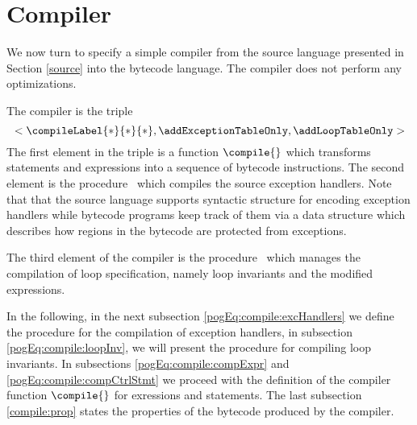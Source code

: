 

\newtheorem{Compiler}{Definition}

\section{Compiler} \label{compile}

We now turn to specify a simple compiler from the source language presented in Section
\ref{source} into the bytecode language. The compiler does not perform any optimizations. 

The compiler is the triple
 $$< \compileLabel{*}{*}{*}, \addExceptionTableOnly , \addLoopTableOnly >$$
 The first element in the triple is a  function $\compile{}$ which transforms statements and expressions
 into a sequence of bytecode instructions. 
The second element is the procedure  \addExceptionTableOnly \ which compiles  the source exception handlers.
Note that that the source language supports syntactic structure for encoding exception handlers while
 bytecode programs keep track of them via a data structure which describes how  regions 
in the bytecode are protected from exceptions.

 The third element of the compiler is the procedure
  \addLoopTableOnly \ which manages the compilation of loop
specification, namely loop invariants and the modified expressions. 

In the following, in the next subsection \ref{pogEq:compile:excHandlers} we define the procedure for the compilation of exception handlers,
 in subsection \ref{pogEq:compile:loopInv},  we will present the procedure for compiling loop invariants.
 In  subsections 
\ref{pogEq:compile:compExpr} and  \ref{pogEq:compile:compCtrlStmt}
we proceed with the definition of the compiler function $\compile{}$ for exressions and statements. 
The last subsection \ref{compile:prop} states the properties of the bytecode produced by the compiler.




%



